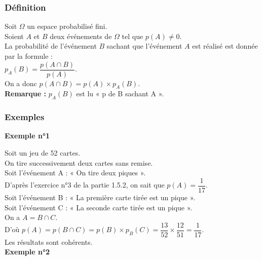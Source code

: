 \subsubsection{Définition}

Soit $\Omega$ un espace probabilisé fini. \\
Soient $A$ et $B$ deux événements de $\Omega$ tel que $p\left(A\right) \neq 0$. \\

La probabilité de l'événement $B$ sachant que l'événement $A$ est réalisé est donnée par la formule : \\

$p_A\left(B\right) = \dfrac{p\left(A \cap B\right)}{p\left(A\right)}$. \\

On a donc $p\left(A \cap B\right) = p\left(A\right) \times p_A\left(B\right)$. \\

\textbf{Remarque :} $p_A\left(B\right)$ est lu « p de B sachant A ».

\subsubsection{Exemples}

\textbf{Exemple n°1} 

Soit un jeu de 52 cartes. \\

On tire successivement deux cartes sans remise. \\

Soit l'événement A : « On tire deux piques ». \\

D'après l'exercice n°3 de la partie 1.5.2, on sait que $p\left(A\right) = \dfrac{1}{17}$. \\

Soit l'événement B : « La première carte tirée est un pique ». \\
Soit l'événement C : « La seconde carte tirée est un pique ». \\

On a $A = B \cap C$. \\
D'où $p\left(A\right) = p\left(B\cap C\right) = p\left(B\right) \times p_B\left(C\right) = \dfrac{13}{52} \times \dfrac{12}{51} = \dfrac{1}{17}$. \\

Les résultats sont cohérents. \\

\textbf{Exemple n°2} 

